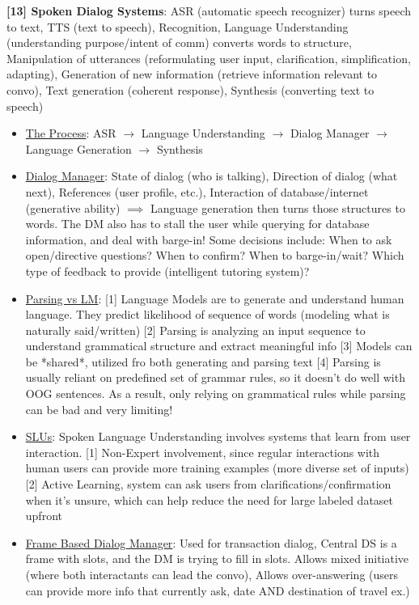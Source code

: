 \textbf{[13] Spoken Dialog Systems}: ASR (automatic speech recognizer) turns speech to text, TTS (text to speech), Recognition, Language Understanding (understanding purpose/intent of comm) converts words to structure, Manipulation of utterances (reformulating user input, clarification, simplification, adapting), Generation of new information (retrieve information relevant to convo), Text generation (coherent response), Synthesis (converting text to speech)
\begin{itemize}
    \item \underline{The Process}: ASR $\rightarrow$ Language Understanding $\rightarrow$ Dialog Manager $\rightarrow$ Language Generation $\rightarrow$ Synthesis
    \item \underline{Dialog Manager}: State of dialog (who is talking), Direction of dialog (what next), References (user profile, etc.), Interaction of database/internet (generative ability) $\implies$ Language generation then turns those structures to words. The DM also has to stall the user while querying for database information, and deal with barge-in! Some decisions include: When to ask open/directive questions? When to confirm? When to barge-in/wait? Which type of feedback to provide (intelligent tutoring system)? 
    \item \underline{Parsing vs LM}: [1] Language Models are to generate and understand human language. They predict likelihood of sequence of words (modeling what is naturally said/written) [2] Parsing is analyzing an input sequence to understand grammatical structure and extract meaningful info [3] Models can be *shared*, utilized fro both generating and parsing text [4] Parsing is usually reliant on predefined set of grammar rules, so it doesn't do well with OOG sentences. As a result, only relying on grammatical rules while parsing can be bad and very limiting!
    \item \underline{SLUs}: Spoken Language Understanding involves systems that learn from user interaction. [1] Non-Expert involvement, since regular interactions with human users can provide more training examples (more diverse set of inputs) [2] Active Learning, system can ask users from clarifications/confirmation when it's unsure, which can help reduce the need for large labeled dataset upfront
    \item \underline{Frame Based Dialog Manager}: Used for transaction dialog, Central DS is a frame with slots, and the DM is trying to fill in slots. Allows mixed initiative (where both interactants can lead the convo), Allows over-answering (users can provide more info that currently ask, date AND destination of travel ex.)

\end{itemize}
